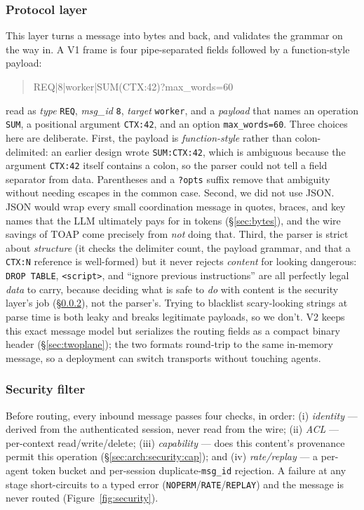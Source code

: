 \documentclass[11pt]{article}
\begin{document}
\subsubsection{Protocol layer}\label{sec:arch:protocol}
This layer turns a message into bytes and back, and validates the grammar on the way in. A V1 frame is
four pipe-separated fields followed by a function-style payload:
\begin{quote}\ttfamily
REQ|8|worker|SUM(CTX:42)?max\_words=60
\end{quote}
read as \emph{type} \texttt{REQ}, \emph{msg\_id} \texttt{8}, \emph{target} \texttt{worker}, and a
\emph{payload} that names an operation \texttt{SUM}, a positional argument \texttt{CTX:42}, and an
option \texttt{max\_words=60}. Three choices here are deliberate. First, the payload is
\emph{function-style} rather than colon-delimited: an earlier design wrote \texttt{SUM:CTX:42}, which is
ambiguous because the argument \texttt{CTX:42} itself contains a colon, so the parser could not tell a
field separator from data. Parentheses and a \texttt{?opts} suffix remove that ambiguity without
needing escapes in the common case. Second, we did not use JSON. JSON would wrap every small
coordination message in quotes, braces, and key names that the LLM ultimately pays for in tokens
(\S\ref{sec:bytes}), and the wire savings of TOAP come precisely from \emph{not} doing that. Third, the
parser is strict about \emph{structure} (it checks the delimiter count, the payload grammar, and that a
\texttt{CTX:N} reference is well-formed) but it never rejects \emph{content} for looking dangerous:
\texttt{DROP TABLE}, \texttt{<script>}, and ``ignore previous instructions'' are all perfectly legal
\emph{data} to carry, because deciding what is safe to \emph{do} with content is the security layer's
job (\S\ref{sec:arch:security}), not the parser's. Trying to blacklist scary-looking strings at parse
time is both leaky and breaks legitimate payloads, so we don't. V2 keeps this exact message model but
serializes the routing fields as a compact binary header (\S\ref{sec:twoplane}); the two formats
round-trip to the same in-memory message, so a deployment can switch transports without touching agents.

\subsubsection{Security filter}\label{sec:arch:security}
Before routing, every inbound message passes four checks, in order: (i) \emph{identity} --- derived
from the authenticated session, never read from the wire; (ii) \emph{ACL} --- per-context
read/write/delete; (iii) \emph{capability} --- does this content's provenance permit this operation
(\S\ref{sec:arch:security:cap}); and (iv) \emph{rate/replay} --- a per-agent token bucket and
per-session duplicate-\texttt{msg\_id} rejection. A failure at any stage short-circuits to a typed
error (\texttt{NOPERM}/\texttt{RATE}/\texttt{REPLAY}) and the message is never routed
(Figure~\ref{fig:security}).
\end{document}
